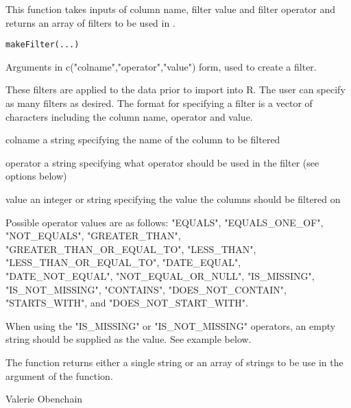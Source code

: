 \documentclass{book}
\begin{document}
\begin{Description}\relax
This function takes inputs of column name, filter value and filter operator and 
returns an array of filters to be used in .
\end{Description}
\begin{Usage}
\begin{verbatim}
makeFilter(...)
\end{verbatim}
\end{Usage}
\begin{Arguments}
\begin{ldescription}
\item[\code{...}] Arguments in c("colname","operator","value") form, used to create a filter.
\end{ldescription}
\end{Arguments}
\begin{Details}\relax
These filters are applied to the data prior to import into R. The user can specify as many 
filters as desired. The format for specifying a filter is a vector of characters including
the column name, operator and value.
\item[colname] a string specifying the name of the column to be filtered 
\item[operator] a string specifying what operator should be used in the filter (see options below)
\item[value] an integer or string specifying the value the columns should be filtered on

Possible operator values are as follows:
"EQUALS", "EQUALS\_ONE\_OF", "NOT\_EQUALS", "GREATER\_THAN", "GREATER\_THAN\_OR\_EQUAL\_TO", 
"LESS\_THAN", "LESS\_THAN\_OR\_EQUAL\_TO", "DATE\_EQUAL", "DATE\_NOT\_EQUAL", 
"NOT\_EQUAL\_OR\_NULL", "IS\_MISSING", "IS\_NOT\_MISSING", "CONTAINS", "DOES\_NOT\_CONTAIN", 
"STARTS\_WITH", and "DOES\_NOT\_START\_WITH".

When using the "IS\_MISSING" or "IS\_NOT\_MISSING" operators, an empty string should be supplied as the value.
See example below.
\end{Details}
\begin{Value}
The function returns either a single string or an array of strings to be use in the
 argument of the  function.
\end{Value}
\begin{Author}\relax
Valerie Obenchain
\end{Author}
\end{document}
